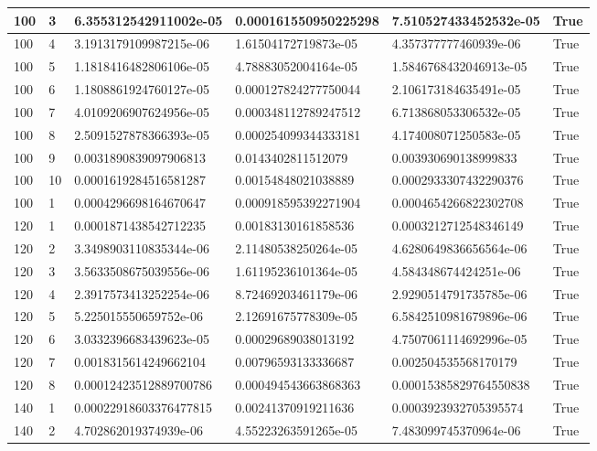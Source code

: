 \documentclass[a4paper, 12pt]{report}
\def\tabsize{4.4cm}
\def\stabsize{0.97cm}
\def\mtabsize{0.73cm}
\begin{document}
\begin{center}
\begin{longtable}{|m{\stabsize}|m{\stabsize}|m{\tabsize}|m{\tabsize}|m{\tabsize}|m{\mtabsize}|}
100 & 3 & 6.355312542911002e-05 & 0.000161550950225298 & 7.510527433452532e-05 & True \\ \hline  
100 & 4 & 3.1913179109987215e-06 & 1.61504172719873e-05 & 4.357377777460939e-06 & True \\ \hline  
100 & 5 & 1.1818416482806106e-05 & 4.78883052004164e-05 & 1.5846768432046913e-05 & True \\ \hline  
100 & 6 & 1.1808861924760127e-05 & 0.000127824277750044 & 2.106173184635491e-05 & True \\ \hline  
100 & 7 & 4.0109206907624956e-05 & 0.000348112789247512 & 6.713868053306532e-05 & True \\ \hline  
100 & 8 & 2.5091527878366393e-05 & 0.000254099344333181 & 4.174008071250583e-05 & True \\ \hline  
100 & 9 & 0.0031890839097906813 & 0.0143402811512079 & 0.003930690138999833 & True \\ \hline  
100 & 10 & 0.0001619284516581287 & 0.00154848021038889 & 0.0002933307432290376 & True \\ \hline  
100 & 1 & 0.0004296698164670647 & 0.000918595392271904 & 0.0004654266822302708 & True \\ \hline  
120 & 1 & 0.0001871438542712235 & 0.00183130161858536 & 0.0003212712548346149 & True \\ \hline  
120 & 2 & 3.3498903110835344e-06 & 2.11480538250264e-05 & 4.6280649836656564e-06 & True \\ \hline  
120 & 3 & 3.5633508675039556e-06 & 1.61195236101364e-05 & 4.584348674424251e-06 & True \\ \hline  
120 & 4 & 2.3917573413252254e-06 & 8.72469203461179e-06 & 2.9290514791735785e-06 & True \\ \hline  
120 & 5 & 5.225015550659752e-06 & 2.12691675778309e-05 & 6.5842510981679896e-06 & True \\ \hline  
120 & 6 & 3.0332396683439623e-05 & 0.00029689038013192 & 4.7507061114692996e-05 & True \\ \hline  
120 & 7 & 0.0018315614249662104 & 0.00796593133336687 & 0.002504535568170179 & True \\ \hline  
120 & 8 & 0.00012423512889700786 & 0.000494543663868363 & 0.00015385829764550838 & True \\ \hline  
140 & 1 & 0.00022918603376477815 & 0.00241370919211636 & 0.0003923932705395574 & True \\ \hline  
140 & 2 & 4.702862019374939e-06 & 4.55223263591265e-05 & 7.483099745370964e-06 & True \\ \hline  

\end{longtable}
\end{center}
\end{document}
